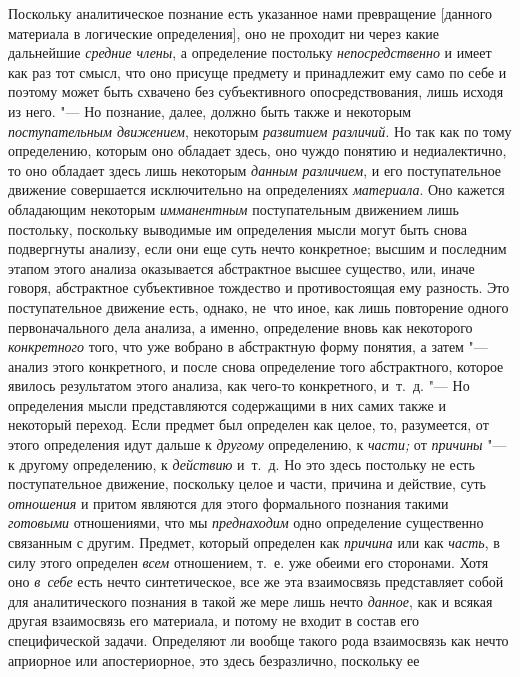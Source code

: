 Поскольку аналитическое познание есть указанное нами
превращение [данного материала в логические определения], оно не проходит
ни через какие дальнейшие {\em средние
члены}, а определение постольку
{\em непосредственно} и
имеет как раз тот смысл, что оно присуще предмету и принадлежит ему само по
себе и поэтому может быть схвачено без субъективного опосредствования, лишь
исходя из него. "--- Но познание, далее, должно быть также и
некоторым {\em поступательным
движением}, некоторым
{\em развитием различий}.
Но так как по тому определению, которым оно обладает здесь,
оно чуждо понятию и недиалектично, то оно обладает здесь лишь некоторым
{\em данным различием}, и
его поступательное движение совершается исключительно на определениях
{\em материала}. Оно
кажется обладающим некоторым
{\em имманентным}
поступательным движением лишь постольку, поскольку выводимые
им определения мысли могут быть снова подвергнуты анализу, если они еще
суть нечто конкретное; высшим и последним этапом этого анализа оказывается
абстрактное высшее существо, или, иначе говоря, абстрактное субъективное
тождество и противостоящая ему разность. Это поступательное движение есть,
однако, не~что иное, как лишь повторение одного первоначального дела
анализа, а именно, определение вновь как некоторого
{\em конкретного} того,
что уже вобрано в абстрактную форму понятия, а затем
"--- анализ этого конкретного, и после снова определение того
абстрактного, которое явилось результатом этого анализа, как чего-то
конкретного, и~т.~д. "--- Но определения мысли
представляются содержащими в них самих также и некоторый
переход. Если предмет был определен как целое, то, разумеется, от этого
определения идут дальше к {\em другому}
определению, к
{\em части;} от
{\em причины} "--- к другому
определению, к {\em действию}
и~т.~д. Но это здесь постольку не есть поступательное
движение, поскольку целое и части, причина и действие, суть
{\em отношения} и притом
являются для этого формального познания такими
{\em готовыми}
отношениями, что мы
{\em преднаходим} одно
определение существенно связанным с другим. Предмет, который определен как
{\em причина} или как
{\em часть}, в силу этого
определен {\em всем}
отношением, т.~е. уже обеими его сторонами. Хотя оно
{\em в~себе} есть нечто
синтетическое, все же эта взаимосвязь представляет собой для аналитического
познания в такой же мере лишь нечто
{\em данное}, как и
всякая другая взаимосвязь его материала, и потому не входит в состав его
специфической задачи. Определяют ли вообще такого рода взаимосвязь как
нечто априорное или апостериорное, это здесь безразлично, поскольку ее
